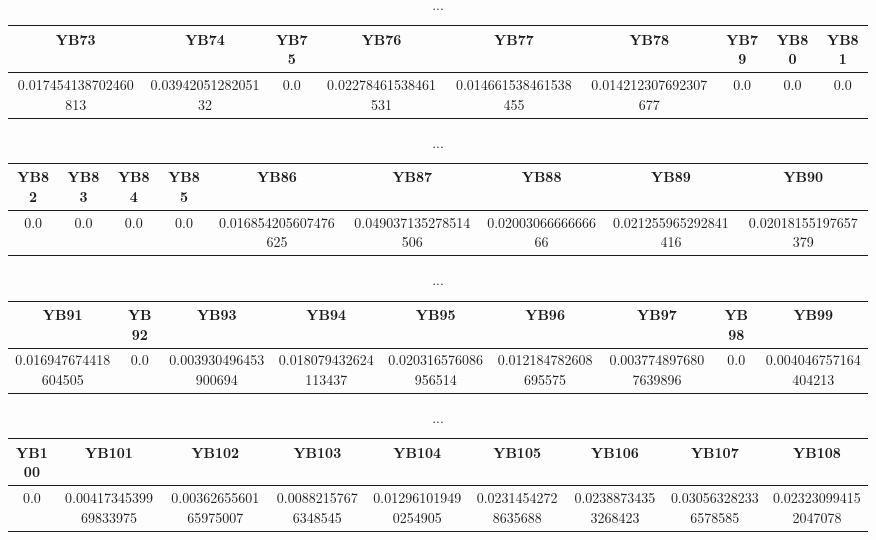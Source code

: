 \documentclass[]{article}
\begin{document}
\begin{table}[h]
      \centering
      \begin{tabular}{|c|c|c|c|c|c|c|c|c|}
            \hline
            YB73                 & YB74               & YB75 & YB76                & YB77                 & YB78                 & YB79 & YB80 & YB81 \\
            \hline
            0.017454138702460813 & 0.0394205128205132 & 0.0  & 0.02278461538461531 & 0.014661538461538455 & 0.014212307692307677 & 0.0  & 0.0  & 0.0  \\
            \hline
      \end{tabular}
      \caption{...}
\end{table}
\begin{table}[h]
      \centering
      \begin{tabular}{|c|c|c|c|c|c|c|c|c|}
            \hline
            YB82 & YB83 & YB84 & YB85 & YB86                 & YB87                 & YB88               & YB89                 & YB90                \\
            \hline
            0.0  & 0.0  & 0.0  & 0.0  & 0.016854205607476625 & 0.049037135278514506 & 0.0200306666666666 & 0.021255965292841416 & 0.02018155197657379 \\
            \hline
      \end{tabular}
      \caption{...}
\end{table}
\begin{table}[h]
      \centering
      \begin{tabular}{|c|c|c|c|c|c|c|c|c|}
            \hline
            YB91                 & YB92 & YB93                 & YB94                 & YB95                 & YB96                 & YB97                  & YB98 & YB99                 \\
            \hline
            0.016947674418604505 & 0.0  & 0.003930496453900694 & 0.018079432624113437 & 0.020316576086956514 & 0.012184782608695575 & 0.0037748976807639896 & 0.0  & 0.004046757164404213 \\
            \hline
      \end{tabular}
      \caption{...}
\end{table}
\begin{table}[h]
      \centering
      \begin{tabular}{|c|c|c|c|c|c|c|c|c|}
            \hline
            YB100 & YB101                 & YB102                 & YB103               & YB104                & YB105               & YB106               & YB107                & YB108                \\
            \hline
            0.0   & 0.0041734539969833975 & 0.0036265560165975007 & 0.00882157676348545 & 0.012961019490254905 & 0.02314542728635688 & 0.02388734353268423 & 0.030563282336578585 & 0.023230994152047078 \\
            \hline
      \end{tabular}
      \caption{...}
\end{table}
\end{document}
